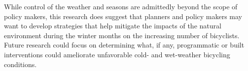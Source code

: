 \documentclass[12pt,letterpaper,article,twocolumn]{memoir}
\begin{document}
While control of the weather and seasons are admittedly beyond the
scope of policy makers, this research does suggest that planners and
policy makers may want to develop strategies that help mitigate the
impacts of the natural environment during the winter months on the
increasing number of bicyclists. Future research could focus on
determining what, if any, programmatic or built interventions could
ameliorate unfavorable cold- and wet-weather bicycling conditions.

\printbibliography
\end{document}
